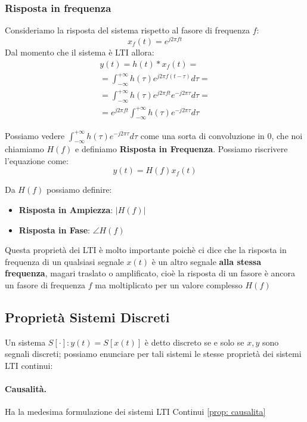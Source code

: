\subsubsection{Risposta in frequenza}
Consideriamo la risposta del sistema rispetto al fasore di frequenza $f$:
\begin{equation*} \label{prop: rispInFreq}
    x_f(t) = e^{j2\pi ft}
\end{equation*}
Dal momento che il sistema è LTI allora:
\begin{align*}
    y(t) = h(t) \ast x_f(t) = \\
    = \int_{-\infty}^{+\infty} h(\tau)e^{j2\pi f(t - \tau)} d\tau =\\
    = \int_{-\infty}^{+\infty} h(\tau)e^{j2\pi ft}e^{-j2\pi\tau} d\tau =\\
    = e^{j2\pi ft} \int_{-\infty}^{+\infty} h(\tau) e^{-j2\pi\tau} d\tau 
\end{align*}
\begin{highlightedeq}
    Possiamo vedere $\int_{-\infty}^{+\infty} h(\tau) e^{-j2\pi\tau} d\tau$ come una sorta di convoluzione in 0, che noi chiamiamo $H(f)$ 
    e definiamo \textbf{Risposta in Frequenza}. Possiamo riscrivere l'equazione come:
    \begin{equation}
        y(t) = H(f)x_f(t)
    \end{equation}
\end{highlightedeq}
Da $H(f)$ possiamo definire:
\begin{itemize}
    \item \textbf{Risposta in Ampiezza}: $|H(f)|$
    \item \textbf{Risposta in Fase}: $\angle H(f)$
\end{itemize}
Questa proprietà dei LTI è molto importante poichè ci dice che la risposta in frequenza di un qualsiasi segnale $x(t)$ è un altro segnale \textbf{alla stessa frequenza}, magari traslato o amplificato,
cioè la risposta di un fasore è ancora un fasore di frequenza $f$ ma moltiplicato per un valore complesso $H(f)$



\subsection{Proprietà Sistemi Discreti}
Un sistema $S[\cdot]:y(t) = S[x(t)]$ è detto discreto se e solo se $x,y$ sono segnali discreti; possiamo enunciare per tali sistemi le stesse proprietà dei sistemi LTI continui:
\paragraph{Causalità.}
Ha la medesima formulazione dei sistemi LTI Continui \eqref{prop: causalita} 

